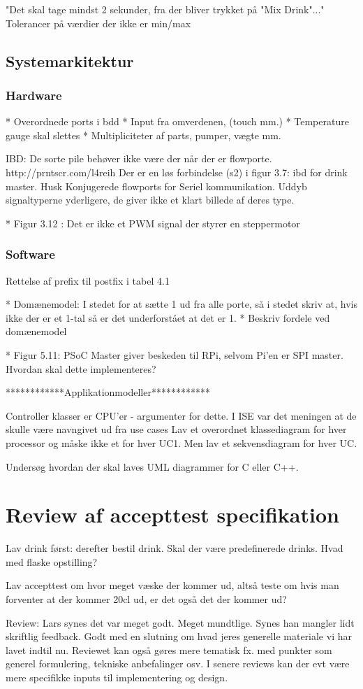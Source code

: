 "Det skal tage mindst 2 sekunder, fra der bliver trykket på "Mix Drink"..."
Tolerancer på værdier der ikke er min/max

\subsection{Systemarkitektur}
\subsubsection{Hardware}

* Overordnede ports i bdd
* Input fra omverdenen, (touch mm.) 
* Temperature gauge skal slettes
* Multipliciteter af parts, pumper, vægte mm.


IBD:
De sorte pile behøver ikke være der når der er flowporte.
http://prntscr.com/l4reih
Der er en løs forbindelse (s2) i figur 3.7: ibd for drink master.
Husk Konjugerede flowports for Seriel kommunikation.
Uddyb signaltyperne yderligere, de giver ikke et klart billede af deres type.


* Figur 3.12 : Det er ikke et PWM signal der styrer en steppermotor

\subsubsection{Software}
Rettelse af prefix til postfix i tabel 4.1

* Domænemodel: I stedet for at sætte 1 ud fra alle porte, så i stedet skriv at, hvis ikke der er et 1-tal så er det underforstået at det er 1.
* Beskriv fordele ved domænemodel


* Figur 5.11: PSoC Master giver beskeden til RPi, selvom Pi'en er SPI master. Hvordan skal dette implementeres?

************Applikationmodeller************

 
Controller klasser er CPU'er - argumenter for dette. I ISE var det meningen at de skulle være navngivet ud fra use cases
Lav et overordnet klassediagram for hver processor og måske ikke et for hver UC1. Men lav et sekvensdiagram for hver UC. 

Undersøg hvordan der skal laves UML diagrammer for C eller C++.

\section{Review af accepttest specifikation}
Lav drink først: derefter bestil drink. Skal der være predefinerede drinks. Hvad med flaske opstilling?

Lav accepttest om hvor meget væske der kommer ud, altså teste om hvis man forventer at der kommer 20cl ud, er det også det der kommer ud?

Review:
Lars synes det var meget godt. Meget mundtlige. Synes han mangler lidt skriftlig feedback. Godt med en slutning om hvad jeres generelle materiale vi har lavet indtil nu.
Reviewet kan også gøres mere tematisk fx. med punkter som generel formulering, tekniske anbefalinger osv. 
I senere reviews kan der evt være mere specifikke inputs til implementering og design.